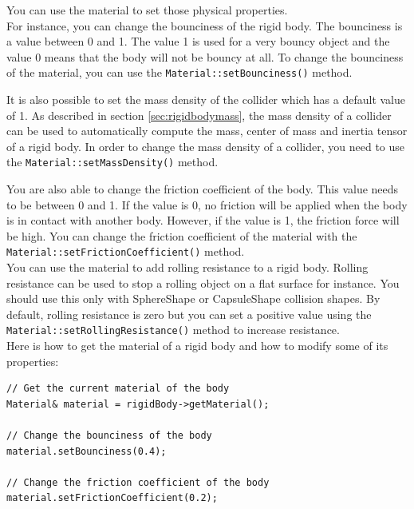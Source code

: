 \documentclass[a4paper,12pt]{article}
\begin{document}
    You can use the material to set those physical properties. \\

    For instance, you can change the bounciness of the rigid body. The bounciness is a value between 0 and 1. The value 1 is used for a very bouncy
    object and the value 0 means that the body will not be bouncy at all. To change the bounciness of the material, you can use the
    \texttt{Material::\allowbreak setBounciness()} method. \\

    \begin{sloppypar}
    It is also possible to set the mass density of the collider which has a default value of 1. As described in section \ref{sec:rigidbodymass}, the
    mass density of a collider can be used to automatically compute the mass, center of mass and inertia tensor of a rigid body. In order to change the
    mass density of a collider, you need to use the \texttt{Material::setMassDensity()} method. \\
    \end{sloppypar}

    You are also able to change the friction coefficient of the body. This value needs to be between 0 and 1. If the value is 0, no friction will be
    applied when the body is in contact with another body. However, if the value is 1, the friction force will be high. You can change the
    friction coefficient of the material with the \texttt{Material::\allowbreak setFrictionCoefficient()} method. \\

    You can use the material to add rolling resistance to a rigid body. Rolling resistance can be used to stop
    a rolling object on a flat surface for instance. You should use this only with SphereShape or
    CapsuleShape collision shapes. By default, rolling resistance is zero but you can
    set a positive value using the \texttt{Material::\allowbreak setRollingResistance()} method to increase resistance. \\

    Here is how to get the material of a rigid body and how to modify some of its properties: \\

    \begin{lstlisting}
// Get the current material of the body
Material& material = rigidBody->getMaterial();

// Change the bounciness of the body
material.setBounciness(0.4);

// Change the friction coefficient of the body
material.setFrictionCoefficient(0.2);
  \end{lstlisting}
\end{document}
